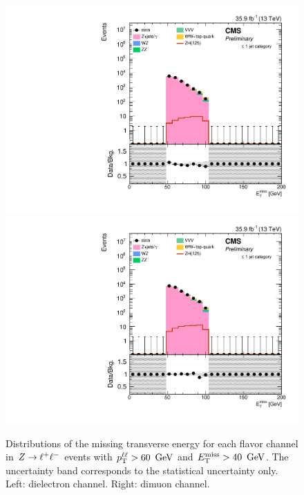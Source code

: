 \begin{figure}[!hbtp]
\begin{center}
\includegraphics[width=\cmsFigWidth]{figures/presel_met_ee.pdf}
\includegraphics[width=\cmsFigWidth]{figures/presel_met_mm.pdf}
\caption{
  Distributions of the missing transverse energy for each flavor channel in $Z\to\ell^+\ell^-$ events with $p_{\mathrm{T}}^{\ell\ell} > 60~\,\text{Ge\hspace{-.08em}V}$ and $E_\mathrm{T}^{\mathrm{miss}} > 40~\,\text{Ge\hspace{-.08em}V}$.
  The uncertainty band corresponds to the statistical uncertainty only. Left: dielectron channel. Right: dimuon channel.
}
\label{fig:distributions_presel_met}
\end{center}
\end{figure}

